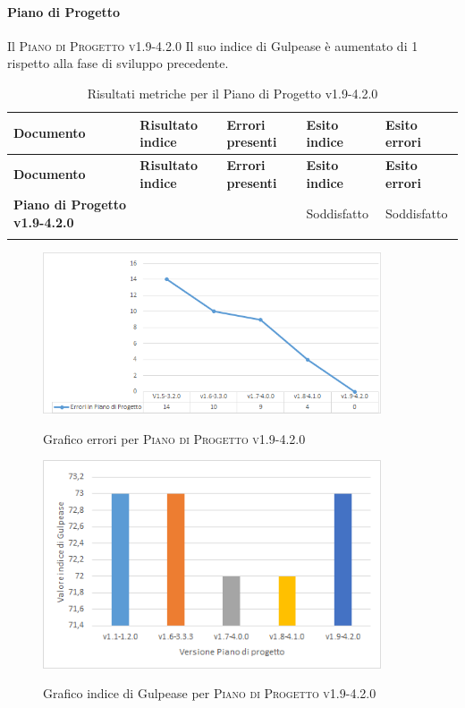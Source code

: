 \paragraph{Piano di Progetto}
\label{sub:piano_di_progetto}
Il \textsc{Piano di Progetto v1.9-4.2.0}
Il suo indice di Gulpease è aumentato di 1 rispetto alla fase di sviluppo precedente.

\renewcommand{\arraystretch}{2} %
\begin{longtable}[H]{>{\centering\bfseries}m{6cm} >{\centering}m{2cm} >{\centering}m{2.5cm} >{\centering}m{2.5cm} >{\centering\arraybackslash}m{2.5cm}}  
  \rowcolor{lightgray}
  {\textbf{Documento}} & {\textbf{Risultato indice}} & {\textbf{Errori presenti}} & {\textbf{Esito indice}} & {\textbf{Esito errori}}  \\
  \endfirsthead%
  \rowcolor{lightgray}
  {\textbf{Documento}} & {\textbf{Risultato indice}} & {\textbf{Errori presenti}} & {\textbf{Esito indice}} & {\textbf{Esito errori}}  \\
  \endhead%
  \textbf{Piano di Progetto v1.9-4.2.0} & 73               & 0               & Soddisfatto & Soddisfatto \\
  \caption{Risultati metriche per il Piano di Progetto v1.9-4.2.0}
  \label{tab:my-table}
\end{longtable}

\begin{figure}[H]
  \centering
  \includegraphics[width=10cm]{img/erroriPdPv1.9-4.2.0.png}
  \label{fig:errori_pdq}
  \caption{Grafico errori per \textsc{Piano di Progetto v1.9-4.2.0}}
\end{figure}

\begin{figure}[H]
  \centering
  \includegraphics[width=10cm]{img/gulpeasePdPv1.9-4.2.0.png}
  \label{fig:gulpease_pdq}
  \caption{Grafico indice di Gulpease per \textsc{Piano di Progetto v1.9-4.2.0}}
\end{figure}



